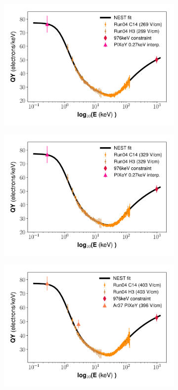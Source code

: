 \begin{figure}[h!]
\begin{subfigure}{0.5\textwidth}
  \includegraphics[width=\textwidth]{Figures/Yields_fit_old/NEST_fit_269Vcm_old_dcm.pdf}
  \caption{}
\end{subfigure}%
\begin{subfigure}{0.5\textwidth}
  \centering
  \includegraphics[width=\textwidth]{Figures/Yields_fit_old/NEST_fit_329Vcm_old_dcm.pdf}
  \caption{}
\end{subfigure}
\begin{subfigure}{0.5\textwidth}
  \centering
  \includegraphics[width=\textwidth]{Figures/Yields_fit_old/NEST_fit_403Vcm_old_dcm.pdf}

\end{subfigure}
\end{figure}
